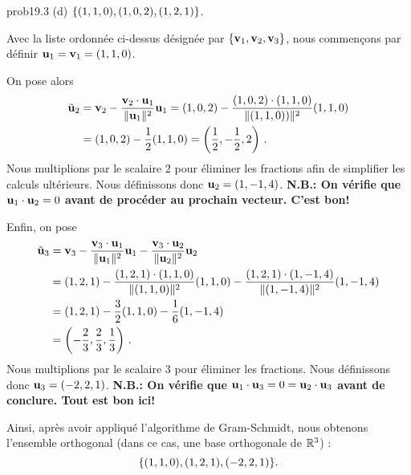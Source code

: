 \begin{sol}{prob19.3}
(d) $\{(1, 1, 0),(1, 0, 2),(1, 2, 1)\}$.


\soln  Avec la liste ordonnée ci-dessus désignée par $\{\mathbf{v}_1, \mathbf{v}_2, \mathbf{v}_3\}$, nous commençons par définir  $\mathbf{u}_1=\mathbf{v}_1=(1, 1, 0)$.

On pose alors \begin{align*}\tilde {\mathbf{u}}_2&= \mathbf{v}_2 -\frac{\mathbf{v}_2\cdot \mathbf{u}_1}{\| \mathbf{u}_1\|^2}\mathbf{u}_1=(1, 0, 2)-\frac{(1, 0, 2)\cdot (1, 1, 0)}{\| (1, 1, 0))\|^2}(1, 1, 0)\\&=(1, 0, 2)-\frac12(1, 1, 0)=\left(\frac12,-\frac12, 2\right)\,.\end{align*} 
Nous multiplions par le scalaire 2 pour éliminer les fractions afin de simplifier les calculs ultérieurs. Nous définissons donc $\mathbf{u}_2=(1,-1,4)$.  {\bf N.B.: On v\'erifie que $\mathbf{u}_1\cdot \mathbf{u}_2=0$ avant de proc\'eder au prochain vecteur. C'est bon!}

Enfin, on pose
\begin{align*}
 \tilde {\mathbf{u}}_3 &=\mathbf{v}_3 -\frac{\mathbf{v}_3\cdot \mathbf{u}_1}{\| \mathbf{u}_1\|^2}\mathbf{u}_1-\frac{\mathbf{v}_3\cdot \mathbf{u}_2}{\| \mathbf{u}_2\|^2}\mathbf{u}_2 \\
  &= (1,2,1)-\frac{(1,2,1)\cdot (1, 1,0)}{\| (1, 1, 0)\|^2}(1, 1,0)-\frac{(1,2,1)\cdot (1,-1,4)}{\| (1,-1,4)\|^2}(1,-1,4)\\
  &=(1,2,1)-\frac32(1, 1,0)-\frac{1}{6}(1,-1,4)\\
  &= \left(-\frac23,\frac23  ,\frac13 \right)\,.\end{align*}
Nous multiplions par le scalaire 3 pour éliminer les fractions. Nous définissons donc $\mathbf{u}_3=(-2,2,1)$. 
 {\bf N.B.: On v\'erifie que $\mathbf{u}_1\cdot \mathbf{u}_3=0=\mathbf{u}_2\cdot \mathbf{u}_3$ avant de conclure. Tout est bon ici!}

Ainsi, après avoir appliqué l'algorithme de Gram-Schmidt, nous obtenons l'ensemble orthogonal (dans ce cas, une base orthogonale de $\mathbb{R}^3$) :  $$\{(1, 1,0),(1,2,1),(-2,2,1)\}.$$



\end{sol}

